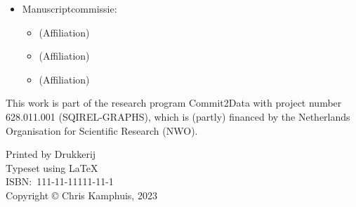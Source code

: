 \begin{itemize}
	\item[] Manuscriptcommissie:
	\begin{itemize}
		\item[]  (Affiliation)
		\item[]  (Affiliation)
		\item[]  (Affiliation)
	\end{itemize}
\end{itemize}

\vfill

\noindent%
\begin{minipage}[b][][b]{0.95\textwidth} %
	{
		\setlength{\parindent}{0cm}%
		This work is part of the research program Commit2Data with project number 628.011.001 (SQIREL-GRAPHS), which is (partly) financed by the Netherlands Organisation for Scientific Research (NWO).
		
	}
	
	\vspace{0.25cm}
	
	{
		\setlength{\parindent}{0cm}%
		Printed by Drukkerij\\[\baselineskip]
		Typeset using \LaTeX\\[\baselineskip]
		ISBN:\ 111{-}11{-}11111{-}11{-}1\\[\baselineskip]
		Copyright \copyright{} Chris Kamphuis, 2023\\[\baselineskip]
	}
\end{minipage}%
